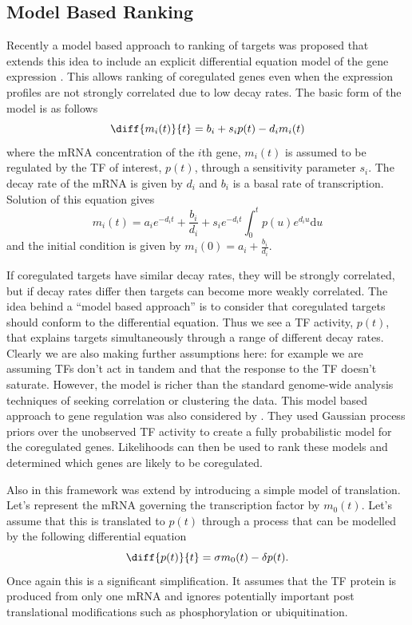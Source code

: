 \documentclass{article}
\begin{document}
\subsection{Model Based Ranking}

Recently a  model based  approach to ranking  of targets  was proposed
that extends  this idea to  include an explicit  differential equation
model  of  the gene  expression  \cite{Barenco:ranked06}. This  allows
ranking of coregulated genes even when the expression profiles are not
strongly  correlated due to  low decay  rates. The  basic form  of the
model is as follows
\begin{equation}
  \diff{m_i(t)}{t} = b_i + s_i p(t) - d_i m_i(t)
\end{equation}
where the mRNA concentration of the $i$th gene, $m_i(t)$ is assumed to
be  regulated by  the TF  of interest,  $p(t)$, through  a sensitivity
parameter $s_i$.  The decay  rate of  the mRNA is  given by  $d_i$ and
$b_i$  is a  basal rate  of transcription.  Solution of  this equation
gives
\begin{equation}
  m_i(t) = a_i e^{-d_it} + \frac{b_i}{d_i} + s_i
  e^{-d_it}\int_0^tp(u)e^{d_i u}\mathrm{d} u \label{eq:linearOperator}
\end{equation}
and the initial condition is given by $m_i(0)=a_i + \frac{b_i}{d_i}$. 

If coregulated targets have similar decay rates, they will be strongly
correlated, but  if decay  rates differ then  targets can  become more
weakly correlated.  The  idea behind a ``model based  approach'' is to
consider that  coregulated targets should conform  to the differential
equation. Thus  we see  a TF activity,  $p(t)$, that  explains targets
simultaneously through  a range of different decay  rates.  Clearly we
are also making further assumptions  here: for example we are assuming
TFs  don't act  in tandem  and  that the  response to  the TF  doesn't
saturate. However,  the model is richer than  the standard genome-wide
analysis   techniques  of  seeking   correlation  or   clustering  the
data. This model based approach to gene regulation was also considered
by  \cite{Gao:latent08}. They  used Gaussian  process priors  over the
unobserved TF activity  to create a fully probabilistic  model for the
coregulated genes.  Likelihoods can then  be used to rank these models
and determined which genes are likely to be coregulated.

Also in \cite{Gao:latent08} this framework was extend by introducing a
simple model  of translation.  Let's represent the  mRNA governing the
transcription factor by $m_0(t)$. Let's assume that this is translated
to  $p(t)$ through a  process that  can be  modelled by  the following
differential equation
\begin{equation}
  \diff{p(t)}{t} = \sigma m_0(t) - \delta p(t).
\end{equation}
Once again this  is a significant simplification. It  assumes that the
TF  protein is  produced from  only one  mRNA and  ignores potentially
important post translational  modifications such as phosphorylation or
ubiquitination.
\end{document}
